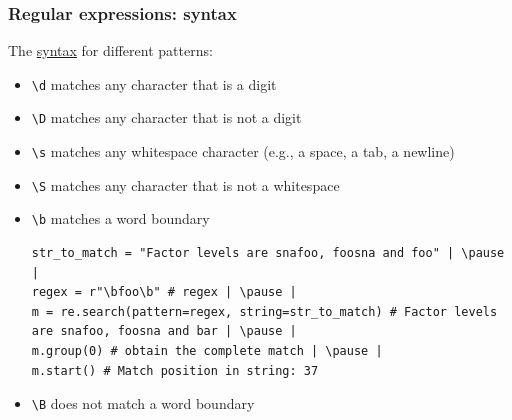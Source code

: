 \documentclass[xcolor=table]{beamer}
\begin{document}
\begin{frame}[fragile]
    \frametitle{Regular expressions: syntax}
    
    The \href{https://docs.python.org/3.7/library/re.html#regular-expression-syntax}{syntax} for different patterns:
    \begin{itemize}
        \item\texttt{\textbackslash d} matches any character that is a digit \pause
        \item\texttt{\textbackslash D} matches any character that is not a digit \pause
        \item\texttt{\textbackslash s} matches any whitespace character (e.g., a space, a tab, a newline) \pause
        \item\texttt{\textbackslash S} matches any character that is not a whitespace \pause
        \item\texttt{\textbackslash b} matches a word boundary \pause
\begin{lstlisting}[style=python,belowskip=-1.5 \baselineskip]
str_to_match = "Factor levels are snafoo, foosna and foo" | \pause |
regex = r"\bfoo\b" # regex | \pause |  
m = re.search(pattern=regex, string=str_to_match) # Factor levels are snafoo, foosna and bar | \pause |
m.group(0) # obtain the complete match | \pause |
m.start() # Match position in string: 37
\end{lstlisting} \pause
        \item\texttt{\textbackslash B} does not match a word boundary 
    \end{itemize}
\end{frame}


\end{document}
